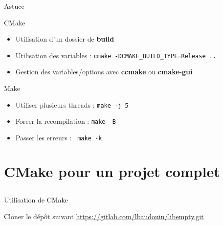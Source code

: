 \documentclass{beamer}
\begin{document}
\begin{frame}[fragile]{Astuce}
  \begin{block}{CMake}
    \begin{itemize}
    \item Utilisation d'un dossier de \textbf{build}
    \item Utilisation des variables : \verb?cmake -DCMAKE_BUILD_TYPE=Release ..?

    \item Gestion des variables/options avec \textbf{ccmake} ou \textbf{cmake-gui}
    \end{itemize}
  \end{block}

  \begin{block}{Make}
    \begin{itemize}
    \item Utiliser plusieurs threads : \verb?make -j 5?
    \item Forcer la recompilation : \verb?make -B?
    \item Passer les erreurs : \verb? make -k?
    \end{itemize}
  \end{block}
\end{frame}

\section{CMake pour un projet complet}
\subsection{}

\begin{frame}[fragile]{Utilisation de CMake}

  \begin{block}{Cloner le dép\^ot suivant}
    \url{https://gitlab.com/lbaudouin/libempty.git}
  \end{block}

\end{frame}
\end{document}
